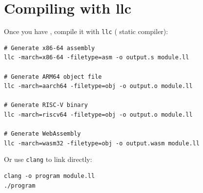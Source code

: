 \section{Compiling with llc}

Once you have  , compile it with \texttt{llc} ( static compiler):

\begin{lstlisting}[style=ir]
# Generate x86-64 assembly
llc -march=x86-64 -filetype=asm -o output.s module.ll

# Generate ARM64 object file
llc -march=aarch64 -filetype=obj -o output.o module.ll

# Generate RISC-V binary
llc -march=riscv64 -filetype=obj -o output.o module.ll

# Generate WebAssembly
llc -march=wasm32 -filetype=obj -o output.wasm module.ll
\end{lstlisting}

Or use \texttt{clang} to link directly:
\begin{lstlisting}[style=ir]
clang -o program module.ll
./program
\end{lstlisting}


